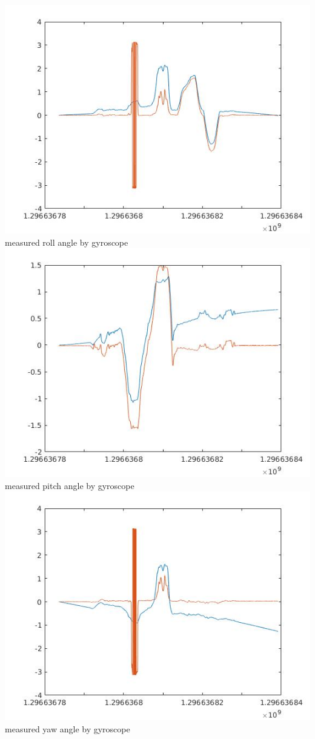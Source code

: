 \documentclass[english]{article}
\begin{document}
\includegraphics[scale = 0.7]{yaw_gyro.jpg}\\
measured roll angle by gyroscope\\
\includegraphics[scale = 0.7]{pitch_gyro.jpg}\\
measured pitch angle by gyroscope\\
\includegraphics[scale = 0.7]{roll_gryo.jpg}\\
measured yaw angle by gyroscope\\
\end{document}
